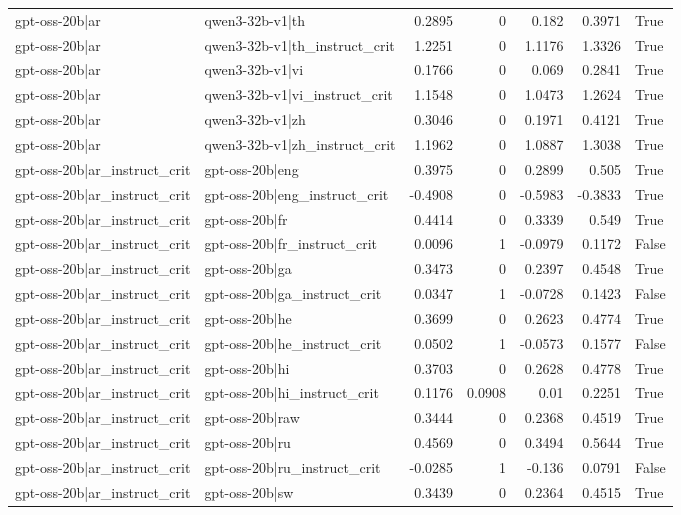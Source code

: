 \begin{table}
\begin{tabular}{l l r r r r l}
gpt-oss-20b|ar & qwen3-32b-v1|th & 0.2895 & 0 & 0.182 & 0.3971 & True \\
gpt-oss-20b|ar & qwen3-32b-v1|th_instruct_crit & 1.2251 & 0 & 1.1176 & 1.3326 & True \\
gpt-oss-20b|ar & qwen3-32b-v1|vi & 0.1766 & 0 & 0.069 & 0.2841 & True \\
gpt-oss-20b|ar & qwen3-32b-v1|vi_instruct_crit & 1.1548 & 0 & 1.0473 & 1.2624 & True \\
gpt-oss-20b|ar & qwen3-32b-v1|zh & 0.3046 & 0 & 0.1971 & 0.4121 & True \\
gpt-oss-20b|ar & qwen3-32b-v1|zh_instruct_crit & 1.1962 & 0 & 1.0887 & 1.3038 & True \\
gpt-oss-20b|ar_instruct_crit & gpt-oss-20b|eng & 0.3975 & 0 & 0.2899 & 0.505 & True \\
gpt-oss-20b|ar_instruct_crit & gpt-oss-20b|eng_instruct_crit & -0.4908 & 0 & -0.5983 & -0.3833 & True \\
gpt-oss-20b|ar_instruct_crit & gpt-oss-20b|fr & 0.4414 & 0 & 0.3339 & 0.549 & True \\
gpt-oss-20b|ar_instruct_crit & gpt-oss-20b|fr_instruct_crit & 0.0096 & 1 & -0.0979 & 0.1172 & False \\
gpt-oss-20b|ar_instruct_crit & gpt-oss-20b|ga & 0.3473 & 0 & 0.2397 & 0.4548 & True \\
gpt-oss-20b|ar_instruct_crit & gpt-oss-20b|ga_instruct_crit & 0.0347 & 1 & -0.0728 & 0.1423 & False \\
gpt-oss-20b|ar_instruct_crit & gpt-oss-20b|he & 0.3699 & 0 & 0.2623 & 0.4774 & True \\
gpt-oss-20b|ar_instruct_crit & gpt-oss-20b|he_instruct_crit & 0.0502 & 1 & -0.0573 & 0.1577 & False \\
gpt-oss-20b|ar_instruct_crit & gpt-oss-20b|hi & 0.3703 & 0 & 0.2628 & 0.4778 & True \\
gpt-oss-20b|ar_instruct_crit & gpt-oss-20b|hi_instruct_crit & 0.1176 & 0.0908 & 0.01 & 0.2251 & True \\
gpt-oss-20b|ar_instruct_crit & gpt-oss-20b|raw & 0.3444 & 0 & 0.2368 & 0.4519 & True \\
gpt-oss-20b|ar_instruct_crit & gpt-oss-20b|ru & 0.4569 & 0 & 0.3494 & 0.5644 & True \\
gpt-oss-20b|ar_instruct_crit & gpt-oss-20b|ru_instruct_crit & -0.0285 & 1 & -0.136 & 0.0791 & False \\
gpt-oss-20b|ar_instruct_crit & gpt-oss-20b|sw & 0.3439 & 0 & 0.2364 & 0.4515 & True \\

\end{tabular}
\end{table}
